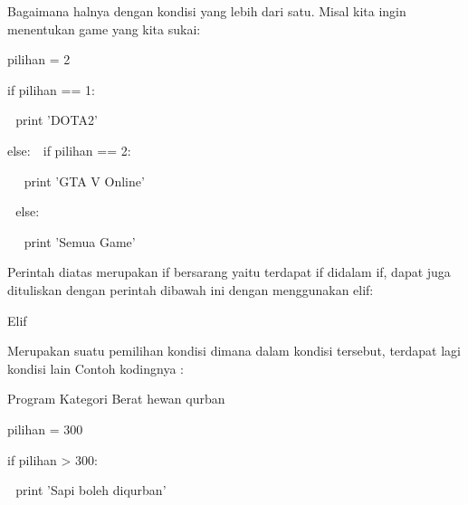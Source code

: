 \noindent 
\vspace{\baselineskip}
Bagaimana halnya dengan kondisi yang lebih dari satu. Misal kita ingin menentukan game yang kita sukai: \par
\noindent 
\vspace{\baselineskip}
pilihan = 2 \par
\noindent 
\vspace{\baselineskip}
if pilihan == 1: \par
\noindent 
\vspace{\baselineskip}
 $  $  $  $ print 'DOTA2' \par
\noindent 
\vspace{\baselineskip}
else:\vspace{\baselineskip}
 $  $  $  $ if pilihan == 2: \par
\noindent 
\vspace{\baselineskip}
 $  $  $  $  $  $  $  $ print 'GTA V Online' \par
\noindent 
\vspace{\baselineskip}
 $  $  $  $ else: \par
\noindent 
\vspace{\baselineskip}
 $  $  $  $  $  $  $  $ print 'Semua Game' \par
\noindent 
\vspace{\baselineskip}
Perintah diatas merupakan if bersarang yaitu terdapat if didalam if, dapat juga dituliskan dengan perintah dibawah ini dengan menggunakan elif: \par
\noindent 
\vspace{\baselineskip}
\vspace{\baselineskip}
Elif \par
\noindent 
\vspace{\baselineskip}
Merupakan suatu pemilihan kondisi dimana dalam kondisi tersebut, terdapat lagi kondisi lain\vspace{\baselineskip}
Contoh kodingnya : \par
\noindent 
\vspace{\baselineskip}
Program Kategori Berat hewan qurban \par
\noindent 
\vspace{\baselineskip}
pilihan = 300 \par
\noindent 
\vspace{\baselineskip}
if pilihan > 300: \par
\noindent 
\vspace{\baselineskip}
 $  $  $  $ print 'Sapi boleh diqurban' \par
